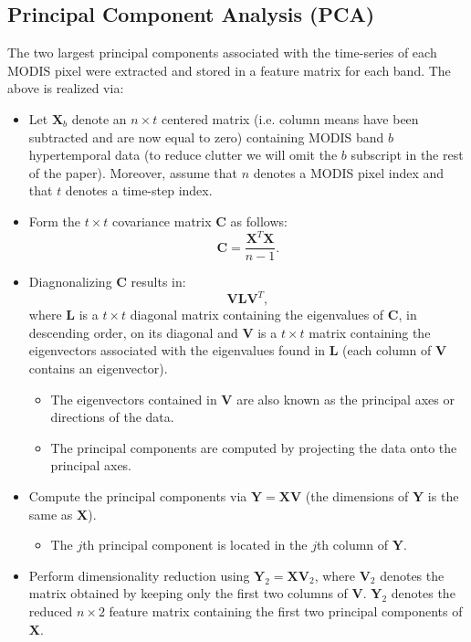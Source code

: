 \documentclass{article}
\begin{document}
\subsection{Principal Component Analysis (PCA)}
\label{sec:PCA}
The two largest principal components associated with the time-series of each MODIS pixel were extracted and stored in a feature matrix for each band. The above is realized
via:
\begin{itemize}
 \item Let $\mathbf{X}_b$ denote an $n\times t$ centered matrix (i.e. column means have been subtracted and are now equal to zero) containing MODIS band $b$ hypertemporal data (to reduce clutter we will omit the $b$ subscript in the rest of the paper). Moreover, assume that $n$ denotes a MODIS pixel index and that $t$ denotes a time-step index. 
 \item Form the $t\times t$ covariance matrix $\mathbf{C}$ as follows:
\begin{equation}
\mathbf{C} = \frac{\mathbf{X}^T\mathbf{X}}{n-1}. 
\end{equation}
\item Diagnonalizing $\mathbf{C}$ results in:
\begin{equation}
\mathbf{V}\mathbf{L}\mathbf{V}^T,
\end{equation}
where $\mathbf{L}$ is a $t\times t$ diagonal matrix containing the eigenvalues of $\mathbf{C}$, in descending order, on its diagonal and $\mathbf{V}$ is a $t\times t$ matrix 
containing the eigenvectors associated with the eigenvalues found in $\mathbf{L}$ (each column of $\mathbf{V}$ contains an eigenvector). 
\begin{itemize}
\item The eigenvectors contained in 
$\mathbf{V}$ are also known as the principal axes or directions of the data.
\item The principal components are computed by projecting the data onto the principal axes.
\end{itemize}
\item Compute the principal components via $\mathbf{Y} = \mathbf{X}\mathbf{V}$ (the dimensions of $\mathbf{Y}$ is the same as $\mathbf{X}$). 
\begin{itemize}
\item The $j$th principal component is located in the $j$th column of $\mathbf{Y}$. 
\end{itemize}
\item Perform dimensionality reduction using $\mathbf{Y}_2 = \mathbf{X}\mathbf{V}_2$, where $\mathbf{V}_2$ denotes the matrix obtained by keeping only the first two columns of 
$\mathbf{V}$. $\mathbf{Y}_2$ denotes the reduced $n\times 2$ feature matrix containing the first two principal components of $\mathbf{X}$.
\end{itemize}
\end{document}
